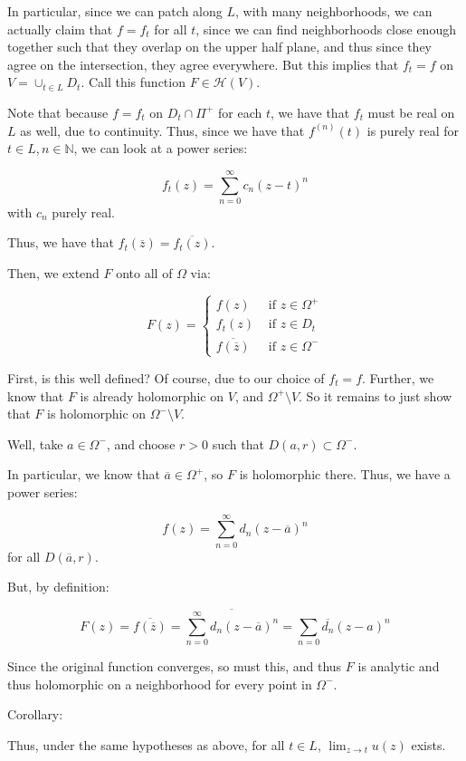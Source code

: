 \documentclass[10pt]{article}
\newcommand{\calH}{\mathcal{H}}
\begin{document}
In particular, since we can patch along $L$, with many neighborhoods, we can actually claim that $f = f_t$ for all $t$, since we can find neighborhoods close enough together such that they overlap on the upper half plane, and thus since they agree on the intersection, they agree everywhere. But this implies that $f_t = f$  on $V = \cup_{t \in L} D_t$. Call this function $F \in \calH(V)$.

Note that because $f = f_t$ on $D_t \cap \Pi^+$ for each $t$, we have that $f_t$ must be real on $L$ as well, due to continuity. Thus, since we have that $f^{(n)}(t)$ is purely real for $t \in L, n \in \mathbb{N}$, we can look at a power series:

$$ f_t(z) = \sum_{n=0}^\infty c_n (z-t)^n$$ with $c_n$ purely real.

Thus, we have that $f_t(\overline{z}) = \overline{f_t(z)}$.

Then, we extend $F$ onto all of $\Omega$ via:

$$F(z) = \begin{cases} f(z) & \text{ if } z \in \Omega^+ \\ f_t(z) & \text{ if } z \in D_t \\ \overline{f(\overline{z})} & \text{ if } z \in \Omega^- \end{cases} $$

First, is this well defined? Of course, due to our choice of $f_t = f$. Further, we know that $F$ is already holomorphic on $V$, and $\Omega^+ \setminus V$. So it remains to just show that $F$ is holomorphic on $\Omega^- \setminus V$.

Well, take $a \in \Omega^-$, and choose $r > 0$ such that $D(a,r) \subset \Omega^-$.

In particular, we know that $\overline{a} \in \Omega^+$, so $F$ is holomorphic there. Thus, we have a power series:

$$ f(z) = \sum_{n=0}^\infty d_n (z - \overline{a})^n $$ for all $D(\overline{a},r)$.

But, by definition:

$$ F(z) = \overline{f(\overline{z})} = \overline{ \sum_{n=0}^\infty d_n (z - \overline{a})^n} = \sum_{n=0} \overline{d_n} (z -a )^n $$

Since the original function converges, so must this, and thus $F$ is analytic and thus holomorphic on a neighborhood for every point in $\Omega^-$.

Corollary:

Thus, under the same hypotheses as above, for all $t \in L$, $\lim_{z \to t} u(z)$ exists.
\end{document}
